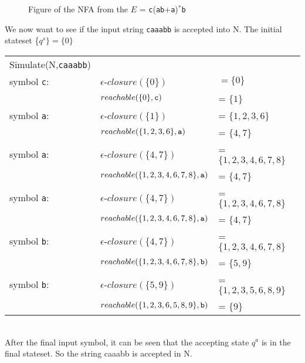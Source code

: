 \begin{myex}
\begin{figure}[h!]
\begin{center}
  \end{center}
  \caption{Figure of the NFA from the $E$ = {\tt c}({\tt ab}+{\tt a})$^*${\tt b}}
  \label{nfasimsucc}
\end{figure}
We now want to see if the input string {\tt caaabb} is accepted into N. The initial stateset \{$q^s\}=\{0\}$ \\
\begin{tabular}{l l l}
Simulate(N,{\tt caaabb}) & & \\
symbol {\tt c}: & $\epsilon$-$closure(\{0\})$ &$ = \{0\}$\\
&$reachable(\{0\},{\tt c})$& = $\{1\}$\\
symbol {\tt a}: & $\epsilon$-$closure(\{1\})$& = $\{1,2,3,6\}$\\
&$reachable(\{1,2,3,6\},{\tt a})$ & = $\{4,7\}$\\
symbol {\tt a}: & $\epsilon$-$closure(\{4,7\})$& = $\{1,2,3,4,6,7,8\}$\\
&$reachable(\{1,2,3,4,6,7,8\},{\tt a})$ &= $\{4,7\}$\\
symbol {\tt a}: & $\epsilon$-$closure(\{4,7\})$& = $\{1,2,3,4,6,7,8\}$\\
&$reachable(\{1,2,3,4,6,7,8\},{\tt a})$ &= $\{4,7\}$\\
symbol {\tt b}: & $\epsilon$-$closure(\{4,7\})$& = $\{1,2,3,4,6,7,8\}$\\
&$reachable(\{1,2,3,4,6,7,8\},{\tt b})$ &= $\{5,9\}$\\
symbol {\tt b}: & $\epsilon$-$closure(\{5,9\})$& = $\{1,2,3,5,6,8,9\}$\\
&$reachable(\{1,2,3,6,5,8,9\},{\tt b})$ &= $\{9\}$\\
\end{tabular}\\
After the final input symbol, it can be seen that the accepting state $q^a$ is in the final stateset. So the string caaabb is accepted in N.
\end{myex}
